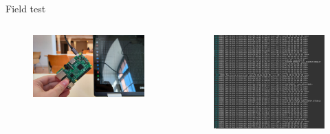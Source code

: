 \documentclass{beamer}
\begin{document}
\begin{frame}{Field test}
	\begin{columns}
		\begin{column}{0.5\textwidth}
			\begin{figure}
				\centering
				\includegraphics[width=1\textwidth]{images/RpiBiblioPhoto.jpg}
			\end{figure}
		\end{column}
		\begin{column}{0.5\textwidth}
			\begin{figure}
				\centering
				\includegraphics[width=1\textwidth]{images/ScanningScreen.png}
			\end{figure}
		\end{column}
	\end{columns}
\end{frame}
\end{document}
